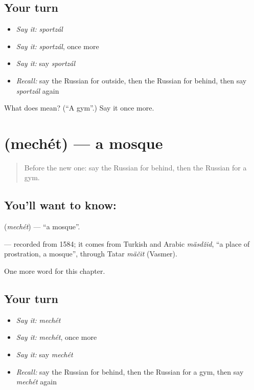 \subsection*{Your turn}
\begin{itemize}
\raggedright
  \item \emph{Say it:} \emph{sportzál}
  \item \emph{Say it:} \emph{sportzál}, once more
  \item \emph{Say it:} say \emph{sportzál}
  \item \emph{Recall:} say the Russian for outside, then the Russian for behind, then say \emph{sportzál} again
\end{itemize}

\begin{tcolorbox}[breakable,colback=teal!4,colframe=teal!35!black,title={Before you move on}]
What does  mean? (\textquotedblleft{}A gym\textquotedblright{}.) Say it once more.
\end{tcolorbox}
\section[\texorpdfstring{\ru{мечеть} (mechét)}{мечеть (mechét)}]{ (mechét) — a mosque}

\label{lesson:RU-C153-mechet}



\begin{quote}
Before the new one: say the Russian for behind, then the Russian for a gym.
\end{quote}

\subsection*{You'll want to know: }
\textbf{} (\emph{mechét}) — \textquotedblleft{}a mosque\textquotedblright{}.

\begin{cousinweb}
\textbf{} — recorded from 1584; it comes from Turkish and Arabic \emph{mäsdžid}, \textquotedblleft{}a place of prostration, a mosque\textquotedblright{}, through Tatar \emph{mäčit} (Vasmer).
\end{cousinweb}

\begin{grammarlens}[title={What you've built}]
One more word for this chapter.
\end{grammarlens}

\subsection*{Your turn}
\begin{itemize}
\raggedright
  \item \emph{Say it:} \emph{mechét}
  \item \emph{Say it:} \emph{mechét}, once more
  \item \emph{Say it:} say \emph{mechét}
  \item \emph{Recall:} say the Russian for behind, then the Russian for a gym, then say \emph{mechét} again
\end{itemize}

